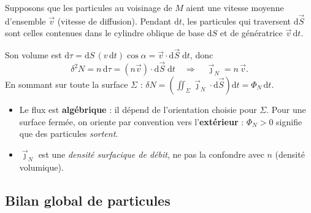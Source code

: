 \documentclass[11pt,a4paper]{article}
\newcommand{\jn}{\vec{\jmath}_N}
\newcommand{\dd}{\mathrm{d}}
\begin{document}
\begin{demo}[title={Démonstration : nombre de particules traversant une surface, $\jn=n\vec v$}]
Supposons que les particules au voisinage de $M$ aient une vitesse moyenne d'ensemble
$\vec v$ (vitesse de diffusion). Pendant $\dd t$, les particules qui traversent $\dd\vec S$
sont celles contenues dans le cylindre oblique de base $\dd S$ et de génératrice
$\vec v\,\dd t$.

\begin{center}
\end{center}

Son volume est $\dd\tau = \dd S\,(v\,\dd t)\cos\alpha = \vec v\cdot\dd\vec S\;\dd t$, donc
\[ \delta^2N = n\,\dd\tau = (n\vec v)\cdot\dd\vec S\;\dd t
   \quad\Longrightarrow\quad \boxed{\jn = n\,\vec v}. \]
En sommant sur toute la surface $\Sigma$ : $\delta N = \left(\iint_\Sigma \jn\cdot\dd\vec S\right)\dd t=\Phi_N\,\dd t$.
\end{demo}

\begin{attention}
\begin{itemize}[leftmargin=1.5em]
  \item Le flux est \textbf{algébrique} : il dépend de l'orientation choisie pour $\Sigma$.
        Pour une surface fermée, on oriente par convention vers l'\textbf{extérieur} :
        $\Phi_N>0$ signifie que des particules \emph{sortent}.
  \item $\jn$ est une \emph{densité surfacique de débit}, ne pas la confondre avec $n$
        (densité volumique).
\end{itemize}
\end{attention}

\subsection{Bilan global de particules}
\end{document}
